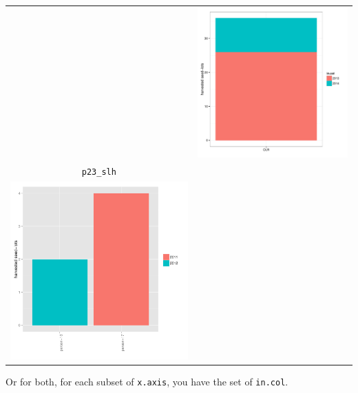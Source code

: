 \documentclass{article}\usepackage[]{graphicx}\usepackage[]{color}
\newenvironment{knitrout}{}{} %
\begin{document}
\begin{itemize}
\begin{center}
\begin{tabular}{cc}
\begin{knitrout}
{}



\end{knitrout}
&
\begin{knitrout}
\definecolor{shadecolor}{rgb}{0.969, 0.969, 0.969}\color{fgcolor}

{\centering \includegraphics[width=.4\textwidth]{figures/shinemas2R_unnamed-chunk-43-1} 

}



\end{knitrout}
\\
\texttt{p23\_slh} & \\
\begin{knitrout}
\definecolor{shadecolor}{rgb}{0.969, 0.969, 0.969}\color{fgcolor}

{\centering \includegraphics[width=.4\textwidth]{figures/shinemas2R_unnamed-chunk-44-1} 

}



\end{knitrout}
&
\\
\end{tabular}
\end{center}


Or for both, for each subset of \texttt{x.axis}, you have the set of \texttt{in.col}.

\end{itemize}
\end{document}
